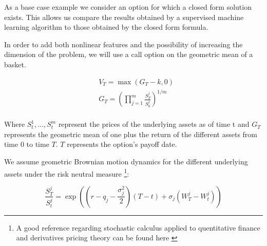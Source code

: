 As a base case example we consider an option for which a closed form solution exists. This allows us compare the results obtained by a supervised machine learning algorithm to those obtained by the closed form formula.

In order to add both nonlinear features and the possibility of increasing the dimension of the problem, we will use a call option on the geometric mean of a basket.

\begin{equation}\label{eq:geom_digital}
\begin{aligned}
&V_{T}=\max\left(G_T-k,0\right) \\
&G_{T}=\left(\prod_{j=1}^{m} \frac{S_{T}^{j}}{S_{0}^{j}}\right)^{1 / m} \\
\end{aligned}
\end{equation}

Where $S_t^1,\ldots,S_t^m$ represent the prices of the underlying assets as of time t and $G_T$ represents the geometric mean of one plus the return of the different assets from time $0$ to time $T$. $T$ represents the option's payoff date.

We assume geometric Brownian motion dynamics   for the different underlying assets under the risk neutral measure \footnote{A good reference regarding stochastic calculus applied to quentitative finance and derivatives pricing theory can be found here \cite{Borj}}:

\begin{equation}\label{eq:geom_brownianmotion}
\frac{S_{T}^{j}}{S_{t}^{j}}=\exp\left(\left(r-q_{j}-\frac{\sigma_{j}^{2}}{2}\right) \left( T - t\right)+\sigma_{j} \left(W_{T}^{j}-W_{t}^{j}\right)\right)
\end{equation}

